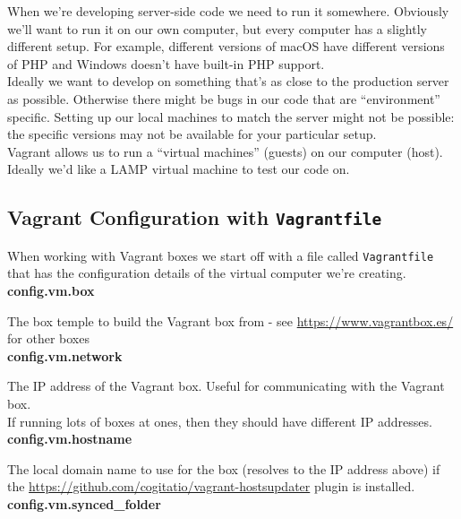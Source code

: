When we're developing server-side code we need to run it somewhere. Obviously we'll want to run it on our own computer, but every computer has a slightly different setup. For example, different versions of macOS have different versions of PHP and Windows doesn't have built-in PHP support.
\\

Ideally we want to develop on something that's as close to the production server as possible. Otherwise there might be bugs in our code that are ``environment'' specific. Setting up our local machines to match the server might not be possible: the specific versions may not be available for your particular setup.
\\

Vagrant allows us to run a ``virtual machines'' (guests) on our computer (host).
\\

Ideally we'd like a LAMP virtual machine to test our code on.

\subsection{Vagrant Configuration with \texttt{Vagrantfile}}

When working with Vagrant boxes we start off with a file called \texttt{Vagrantfile} that has the configuration details of the virtual computer we're creating.
\\

\textbf{config.vm.box}

The box temple to build the Vagrant box from - see \href{vagrantbox.es}{https://www.vagrantbox.es/} for other boxes
\\

\textbf{config.vm.network}

The IP address of the Vagrant box. Useful for communicating with the Vagrant box.
\\

If running lots of boxes at ones, then they should have different IP addresses.
\\

\textbf{config.vm.hostname}

The local domain name to use for the box (resolves to the IP address above) if the \href{vagrant-hostsupdater}{https://github.com/cogitatio/vagrant-hostsupdater} plugin is installed.
\\

\textbf{config.vm.synced\_folder}

